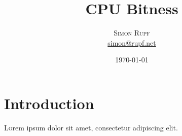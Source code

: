 \documentclass[twoside,twocolumn]{article}
\title{CPU Bitness} %
\author{%
\textsc{Simon Rupf} \\[1ex]
\normalsize \href{mailto:simon@rupf.net}{simon@rupf.net}
}
\date{\today} %
\begin{document}
\maketitle


\section{Introduction}

\lettrine[nindent=0em,lines=3]{L} orem ipsum dolor sit amet, consectetur adipiscing elit.

\end{document}
